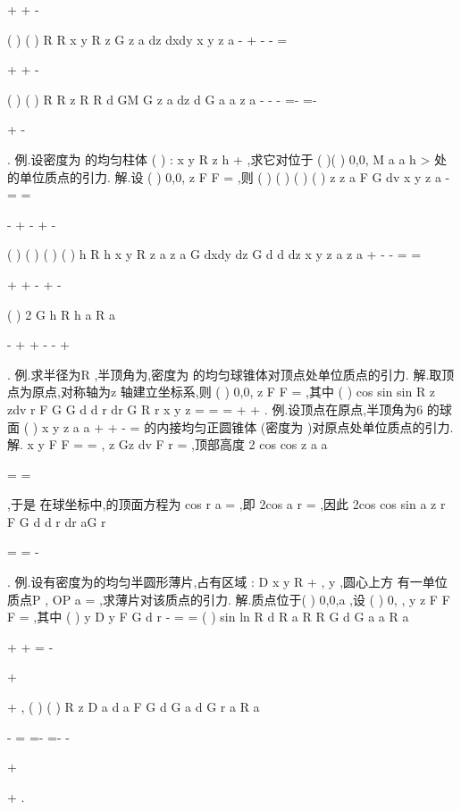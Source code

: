 +
+
-


\int \int \int 
(
)
(
)
R
R
x
y
R
z
G
z
a dz
dxdy
x
y
z
a
\rho 
-
+
\le 
-
-
=


+
+
-


\int 
\int \int 
(
)
(
)
R
R
z
R
R
d
GM
G
z
a dz
d
G
a
a
z
a
\pi 
\pi 
\rho 
\rho \rho 
\rho 
\theta 
\rho 
-
-
-
=-
=-


+
-


\int 
\int 
\int 
. 
\textcolor{lyred}{例}.设密度为
\rho 的均匀柱体
(
)
:
x
y
R
z
h
\Omega 
+
\le 
\le \le 
,求它对位于
(
)(
)
0,0,
M
a a
h
>
处的单位质点的引力. 
解.设
(
)
0,0,
z
F
F
=
\rho 
,则
(
)
(
)
(
)
(
)
z
z
a
F
G
dv
x
y
z
a
\rho 
\Omega 
-
=
=


-
+
-
+
-


\int \int \int 
(
)
(
)
(
)
(
)
h
R
h
x
y
R
z
a
z
a
G
dxdy
dz
G
d
d
dz
x
y
z
a
z
a
\pi 
\rho 
\rho 
\theta \rho \rho 
\rho 
+
\le 
-
-
=
=




+
+
-
+
-




\int \int 
\int 
\int 
\int 
\int 
(
)
2 G
h
R
h
a
R
a
\pi 
\rho 

-
+
+
-
-
+



. 
\textcolor{lyred}{例}.求半径为R ,半顶角为\alpha ,密度为
\rho 的均匀球锥体对顶点处单位质点的引力. 
解.取顶点为原点,对称轴为z 轴建立坐标系,则
(
)
0,0,
z
F
F
=
\rho 
,其中 
(
)
cos
sin
sin
R
z
zdv
r
F
G
G
d
d
r
dr
G
R
r
x
y
z
\pi 
\alpha 
\rho 
\varphi 
\rho 
\theta 
\varphi 
\varphi 
\rho \pi 
\alpha 
\Omega 
=
=
\cdots 
=
+
+
\int \int \int 
\int 
\int 
\int 
. 
\textcolor{lyred}{例}.设顶点在原点,半顶角为6
\pi 的球面
(
)
x
y
z
a
a
+
+
-
=
的内接均匀正圆锥体 
\Omega (密度为
\rho )对原点处单位质点的引力. 
解.
x
y
F
F
=
=
,
z
Gz
dv
F
r
\rho 
\Omega 
=\int \int \int 
,\Omega 顶部高度
2 cos
cos
z
a
a
\pi 
\pi 


=
=




,于是 
在球坐标中,\Omega 的顶面方程为
cos
r
a
\varphi =
,即
2cos
a
r
\varphi 
=
,因此 
2cos
cos
sin
a
z
r
F
G
d
d
r dr
aG
r
\pi 
\varphi 
\pi 
\varphi 
\rho 
\theta 
\varphi \varphi 
\rho 
\pi 


=
\cdots 
=
-






\int 
\int 
\int 
. 
\textcolor{lyred}{例}.设有密度为\mu 的均匀半圆形薄片,占有区域
:
D x
y
R
+
\le 
,
y \ge 
,圆心上方 
有一单位质点P , OP
a
=
,求薄片对该质点的引力. 
解.质点位于(
)
0,0,a ,设
(
)
0,
,
y
z
F
F F
=
\rho 
,其中
(
)
y
D
y
F
G
d
r
\mu 
\sigma 
-
=
=
\int \int 
(
)
sin
ln
R
d
R
a
R
R
G
d
G
a
a
R
a
\pi 
\rho 
\theta \rho \rho 
\mu 
\theta 
\mu 
\rho 


\cdots 
+
+
=
-




+


+
\int 
\int 
, 
(
)
(
)
R
z
D
a
d
a
F
G
d
G a d
G
r
a
R
a
\pi 
\mu 
\rho \rho 
\sigma 
\mu 
\theta 
\mu \pi 
\rho 


-
=
=-
=-
-


+


+
\int \int 
\int 
\int 
. 